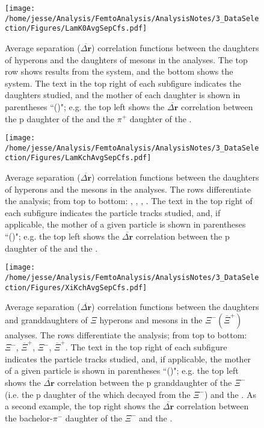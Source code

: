 \documentclass[/home/jesse/Analysis/FemtoAnalysis/AnalysisNotes/AnalysisNoteJBuxton.tex]{subfiles}
\begin{document}
\begin{figure}[h]
  \centering
  \texttt{[image: /home/jesse/Analysis/FemtoAnalysis/AnalysisNotes/3\_DataSelection/Figures/LamK0AvgSepCfs.pdf]}
  \caption[Average separation of \LamALam and \Ks daughters]
  {
  Average separation ($\overline{\Delta\mathbf{r}}$) correlation functions between the daughters of \LamALam hyperons and the daughters of \Ks mesons in the \LamALamKs analyses. 
  The top row shows results from the \LamKs system, and the bottom shows the \ALamKs system. 
  The text in the top right of each subfigure indicates the daughters studied, and the mother of each daughter is shown in parentheses ``()"; e.g. the top left shows the $\overline{\Delta\mathbf{r}}$ correlation between the p daughter of the \Lam and the $\pi^{+}$ daughter of the \Ks.
  }
  \label{fig:AvgSepLamK0}
\end{figure}

\begin{figure}[h]
  \centering
  \texttt{[image: /home/jesse/Analysis/FemtoAnalysis/AnalysisNotes/3\_DataSelection/Figures/LamKchAvgSepCfs.pdf]}
  \caption[Average separation of \LamALam daughters and \Kpm]
  {
  Average separation ($\overline{\Delta\mathbf{r}}$) correlation functions between the daughters of \LamALam hyperons and the \Kpm mesons in the \LamALamKpm analyses.  
  The rows differentiate the analysis; from top to bottom: \LamKchP, \ALamKchM, \LamKchM, \ALamKchP.
  The text in the top right of each subfigure indicates the particle tracks studied, and, if applicable, the mother of a given particle is shown in parentheses ``()"; e.g. the top left shows the $\overline{\Delta\mathbf{r}}$ correlation between the p daughter of the \Lam and the \KchP.
  }
  \label{fig:AvgSepLamKch}
\end{figure}



\begin{figure}[h]
  \centering
  \texttt{[image: /home/jesse/Analysis/FemtoAnalysis/AnalysisNotes/3\_DataSelection/Figures/XiKchAvgSepCfs.pdf]}
  \caption[Average separation of $\Xi$ daughters and \Kpm]
  {
  Average separation ($\overline{\Delta\mathbf{r}}$) correlation functions between the daughters and granddaughters of $\Xi$ hyperons and \Kpm mesons in the $\Xi^{-}(\overline{\Xi}^{+})$\Kpm analyses.  
  The rows differentiate the analysis; from top to bottom: $\Xi^{-}$\KchP, $\overline{\Xi}^{+}$\KchM, $\Xi^{-}$\KchM, $\overline{\Xi}^{+}$\KchP.
  The text in the top right of each subfigure indicates the particle tracks studied, and, if applicable, the mother of a given particle is shown in parentheses ``()"; e.g. the top left shows the $\overline{\Delta\mathbf{r}}$ correlation between the p granddaughter of the $\Xi^{-}$ (i.e. the p daughter of the \Lam which decayed from the $\Xi^{-}$) and the \KchP.
  As a second example, the top right shows the $\overline{\Delta\mathbf{r}}$ correlation between the bachelor-$\pi^{-}$ daughter of the $\Xi^{-}$ and the \KchP.
  }
  \label{fig:AvgSepXiKch}
\end{figure}


\clearpage
\end{document}
